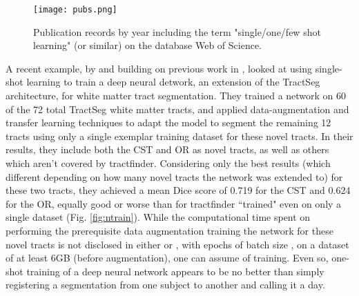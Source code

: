 \begin{figure}
  \centering
  \texttt{[image: pubs.png]}
  \caption{Publication records by year including the term "single/one/few shot learning" (or similar) on the database Web of Science.}
  \label{fig:pubs}
\end{figure}

A recent example, by \textcite{Liu2023a} and building on previous work in \textcite{Lu2021}, looked at using single-shot learning to train a deep neural detwork, an extension of the TractSeg architecture, for white matter tract segmentation.
They trained a network on 60 of the 72 total TractSeg white matter tracts, and applied data-augmentation and transfer learning techniques to adapt the model to segment the remaining 12 tracts using only a single exemplar training dataset for these novel tracts.
In their results, they include both the CST and OR as novel tracts, as well as others which aren't covered by tractfinder.
Considering only the best results (which different depending on how many novel tracts the network was extended to) for these two tracts, they achieved a mean Dice score of 0.719 for the CST and 0.624 for the OR, equally good or worse than for tractfinder ``trained" even on only a single dataset (Fig. \ref{fig:ntrain}).
While the computational time spent on performing the prerequisite data augmentation training the network for these novel tracts is not disclosed in either \textcite{Liu2023a} or \textcite{Wasserthal2018}, with  epochs of batch size , on a dataset of at least 6GB (before augmentation), one can assume  of training.
Even so, one-shot training of a deep neural network appears to be no better than simply registering a segmentation from one subject to another and calling it a day.
